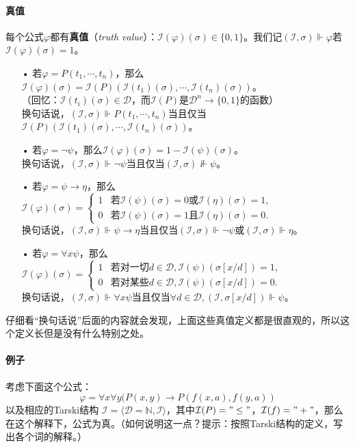 \documentclass[b5paper,oneside]{ctexbook}
\begin{document}
\paragraph{真值}每个公式$\varphi$都有\textbf{真值}（\textit{truth value}）：$\mathscr I(\varphi)(\sigma )\in\{0,1\}$。我们记$(\mathscr I,\sigma)\Vdash\varphi$若$\mathscr I(\varphi)(\sigma)=1$。
\begin{enumerate}
\item[•]若$\varphi=P(t_1,\cdots ,t_n)$，那么$\mathscr I(\varphi)(\sigma)=\mathcal I(P)(\mathscr I(t_1)(\sigma),\cdots ,\mathscr I(t_n)(\sigma))$。\\（回忆：$\mathscr I(t_i)(\sigma)\in\mathcal{D}$，而$\mathcal{I}(P)$是$\mathcal{D}^n\to\{0,1\}$的函数）\\换句话说，$(\mathscr I,\sigma)\Vdash P(t_1,\cdots ,t_n)$当且仅当$\mathcal{I}(P)(\mathscr I(t_1)(\sigma),\cdots ,\mathscr I(t_n)(\sigma))$。
\item[•]若$\varphi=\neg\psi$，那么$\mathscr I(\varphi)(\sigma)=1-\mathscr I(\psi)(\sigma)$。\\换句话说，$(\mathscr I,\sigma)\Vdash \neg\psi$当且仅当$(\mathscr I,\sigma)\not\Vdash\psi$。
\item[•]若$\varphi=\psi\to\eta$，那么$\mathscr I(\varphi)(\sigma)=\begin{cases}1&\text{若}\mathscr I(\psi)(\sigma)=0\text{或}\mathscr I(\eta)(\sigma)=1,\\0&\text{若}\mathscr I(\psi)(\sigma)=1\text{且}\mathscr I(\eta)(\sigma)=0.\end{cases}$\\换句话说，$(\mathscr I,\sigma)\Vdash \psi\to\eta$当且仅当$(\mathscr I,\sigma)\Vdash\neg\psi$或$(\mathscr I,\sigma)\Vdash\eta$。
\item[•]若$\varphi=\forall x\psi$，那么$\mathscr I(\varphi)(\sigma)=\begin{cases}1&\text{若对一切}d\in\mathcal D,\mathscr I(\psi)(\sigma [x/d])=1,\\0&\text{若对某些}d\in\mathcal D,\mathscr I(\psi)(\sigma [x/d])=0.\end{cases}$\\换句话说，$(\mathscr I,\sigma)\Vdash \forall x\psi$当且仅当$\forall d\in\mathcal D,(\mathscr I,\sigma [x/d])\Vdash\psi$。
\end{enumerate}
仔细看“换句话说”后面的内容就会发现，上面这些真值定义都是很直观的，所以这个定义长但是没有什么特别之处。
\paragraph{例子}考虑下面这个公式：
\[\varphi=\forall x\forall y(P(x,y)\to P(f(x,a),f(y,a))\]
以及相应的Tarski结构
$\mathscr{I}=\langle\mathcal{D}=\mathbb{N},\mathcal{I}\rangle$，其中$\mathcal{I}(P)="\leq "$，$\mathcal{I}(f)="+"$，那么在这个解释下，公式为真。（如何说明这一点？提示：按照Tarski结构的定义，写出各个词的解释。）
\end{document}
